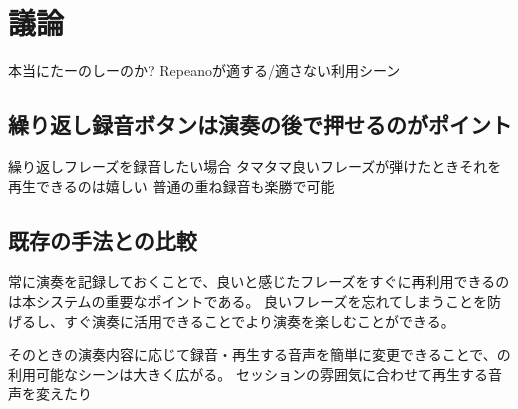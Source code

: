 \section{議論}

本当にたーのしーのか?
Repeanoが適する/適さない利用シーン

\subsection{繰り返し録音ボタンは演奏の後で押せるのがポイント}
繰り返しフレーズを録音したい場合
タマタマ良いフレーズが弾けたときそれを再生できるのは嬉しい
普通の重ね録音も楽勝で可能

\subsection{既存の手法との比較}






常に演奏を記録しておくことで、良いと感じたフレーズをすぐに再利用できるのは本システムの重要なポイントである。
良いフレーズを忘れてしまうことを防げるし、すぐ演奏に活用できることでより演奏を楽しむことができる。

そのときの演奏内容に応じて録音・再生する音声を簡単に変更できることで、{\system}の利用可能なシーンは大きく広がる。
セッションの雰囲気に合わせて再生する音声を変えたり

